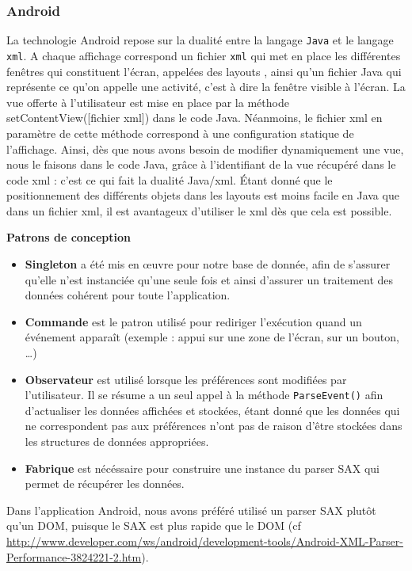 \documentclass[a4paper, 11px]{article}
\begin{document}
\subsubsection{Android}
La technologie Android repose sur la dualité entre la langage \texttt{Java} et le langage \texttt{xml}. A chaque affichage correspond un fichier \texttt{xml} qui met en place les différentes fenêtres qui constituent l'écran, appelées des \og layouts \fg, ainsi qu'un fichier Java qui représente ce qu'on appelle une activité, c'est à dire la fenêtre visible à l'écran. La vue offerte à l'utilisateur est mise en place par la méthode setContentView([fichier xml]) dans le code Java. Néanmoins, le fichier xml en paramètre de cette méthode correspond à une configuration statique de l'affichage. Ainsi, dès que nous avons besoin de modifier dynamiquement une vue, nous le faisons dans le code Java, grâce à l'identifiant de la vue récupéré dans le code xml : c'est ce qui fait la dualité Java/xml. \'Etant donné que le positionnement des différents objets dans les layouts est moins facile en Java que dans un fichier xml, il est avantageux d'utiliser le xml dès que cela est possible.

{\bf Patrons de conception}

\begin{itemize}
	\item {\bf Singleton} a été mis en œuvre pour notre base de donnée, afin de s'assurer qu'elle n'est instanciée qu'une seule fois et ainsi d'assurer un traitement des données cohérent pour toute l'application.\\
	\item {\bf Commande} est le patron utilisé pour rediriger l'exécution quand un événement apparaît (exemple : appui sur une zone de l'écran, sur un bouton, \dots)\\
	\item {\bf Observateur} est utilisé lorsque les préférences sont modifiées par l'utilisateur. Il se résume a un seul appel à la méthode \texttt{ParseEvent()} afin d'actualiser les données affichées et stockées, étant donné que les données qui ne correspondent pas aux préférences n'ont pas de raison d'être stockées dans les structures de données appropriées.
	\item {\bf Fabrique} est nécéssaire pour construire une instance du parser SAX qui permet de récupérer les données.
\end{itemize}
Dans l'application Android, nous avons préféré utilisé un parser SAX plutôt qu'un DOM, puisque le SAX est plus rapide que le DOM (cf \href{http://www.developer.com/ws/android/development-tools/Android-XML-Parser-Performance-3824221-2.htm}{http://www.developer.com/ws/android/development-tools/Android-XML-Parser-Performance-3824221-2.htm}).
\end{document}
